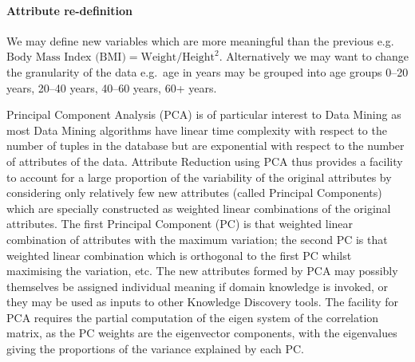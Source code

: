 \documentclass[a4paper,12pt,notitlepage,pdftex]{scrreprt}
\begin{document}
        \paragraph{Attribute re-definition}
            We may define new variables which are more meaningful than the previous e.g.\ $\text{Body Mass Index
                (BMI)} = \text{Weight} / \text{Height}^2$.
            Alternatively we may want to change the granularity of the data e.g.\ age in years may be grouped into age
            groups 0--20 years, 20--40 years, 40--60 years, 60+ years.

            Principal Component Analysis (PCA) is of particular interest to Data Mining as most Data Mining algorithms
            have linear time complexity with respect to the number of tuples in the database but are exponential with
            respect to the number of attributes of the data.
            Attribute Reduction using PCA thus provides a facility to account for a large proportion of the
            variability of the original attributes by considering only relatively few new attributes (called Principal
            Components) which are specially constructed as weighted linear combinations of the original attributes.
            The first Principal Component (PC) is that weighted linear combination of attributes with the maximum
            variation; the second PC is that weighted linear combination which is orthogonal to the first PC whilst
            maximising the variation, etc.
            The new attributes formed by PCA may possibly themselves be assigned individual meaning if domain
            knowledge is invoked, or they may be used as inputs to other Knowledge Discovery tools.
            The facility for PCA requires the partial computation of the eigen system of the correlation matrix, as
            the PC weights are the eigenvector components, with the eigenvalues giving the proportions of the variance
            explained by each PC\@.
\end{document}
